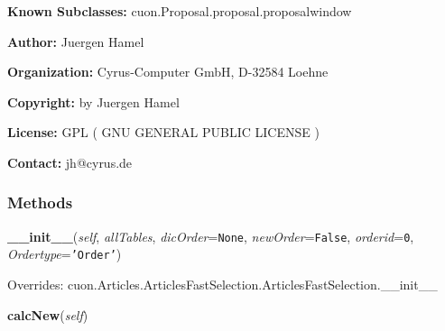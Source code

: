\textbf{Known Subclasses:} cuon.Proposal.proposal.proposalwindow

\textbf{Author:} Juergen Hamel



\textbf{Organization:} Cyrus-Computer GmbH, D-32584 Loehne



\textbf{Copyright:} by Juergen Hamel



\textbf{License:} GPL ( GNU GENERAL PUBLIC LICENSE )



\textbf{Contact:} jh@cyrus.de





  \subsubsection{Methods}

    \vspace{0.5ex}

\hspace{.8\funcindent}\begin{boxedminipage}{\funcwidth}

    \raggedright \textbf{\_\_init\_\_}(\textit{self}, \textit{allTables}, \textit{dicOrder}={\tt None}, \textit{newOrder}={\tt False}, \textit{orderid}={\tt 0}, \textit{Ordertype}={\tt \texttt{'}\texttt{Order}\texttt{'}})

\setlength{\parskip}{2ex}
\setlength{\parskip}{1ex}
      Overrides: cuon.Articles.ArticlesFastSelection.ArticlesFastSelection.\_\_init\_\_

    \end{boxedminipage}

    \label{cuon:Order:order:orderwindow:calcNew}

    \vspace{0.5ex}

\hspace{.8\funcindent}\begin{boxedminipage}{\funcwidth}

    \raggedright \textbf{calcNew}(\textit{self})

\setlength{\parskip}{2ex}
\setlength{\parskip}{1ex}
    \end{boxedminipage}

